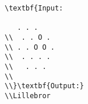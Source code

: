 \begin{verbatim}
\textbf{Input:

   . . .
\\  . . O .
\\ . . O O .
\\  . . . .
\\   . . .
\\
\\}\textbf{Output:}
\\Lillebror\end{verbatim}